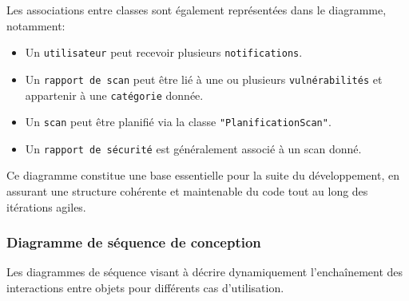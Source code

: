 Les associations entre classes sont également représentées dans le diagramme, notamment:
\begin{itemize}[label=$-$]
    \item Un \texttt{utilisateur} peut recevoir plusieurs \texttt{notifications}.
    \item Un \texttt{rapport de scan} peut être lié à une ou plusieurs \texttt{vulnérabilités} et appartenir à une \texttt{catégorie} donnée.
    \item Un \texttt{scan} peut être planifié via la classe \texttt{"PlanificationScan"}.
    \item Un \texttt{rapport de sécurité} est généralement associé à un scan donné.
\end{itemize}
Ce diagramme constitue une base essentielle pour la suite du développement, en assurant une structure cohérente et maintenable du code tout au long des itérations agiles.

\subsubsection{Diagramme de séquence de conception}
Les diagrammes de séquence visant à décrire dynamiquement l’enchaînement des interactions entre objets pour différents cas d'utilisation.

